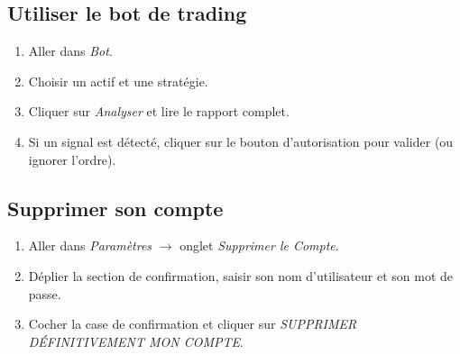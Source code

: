 \documentclass[a4paper, 12pt, twoside]{article}
\begin{document}
    \subsection*{Utiliser le bot de trading}
    \begin{enumerate}
        \item Aller dans \textit{Bot}.
        \item Choisir un actif et une stratégie.
        \item Cliquer sur \textit{Analyser} et lire le rapport complet.
        \item Si un signal est détecté, cliquer sur le bouton
              d'autorisation pour valider (ou ignorer l'ordre).
    \end{enumerate}

    \subsection*{Supprimer son compte}
    \begin{enumerate}
        \item Aller dans \textit{Paramètres} $\to$ onglet
              \textit{Supprimer le Compte}.
        \item Déplier la section de confirmation, saisir son nom
              d'utilisateur et son mot de passe.
        \item Cocher la case de confirmation et cliquer sur
              \textit{SUPPRIMER DÉFINITIVEMENT MON COMPTE}.
    \end{enumerate}
\end{document}
